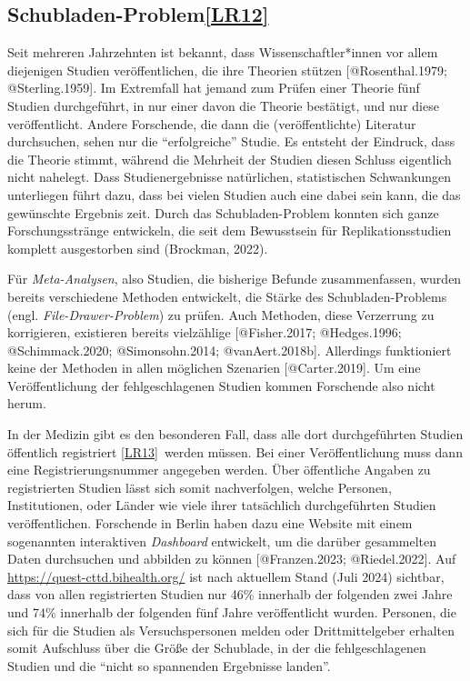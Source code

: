 \documentclass[
  letterpaper,
  DIV=11,
  numbers=noendperiod]{scrreprt}
\begin{document}
\subsection{\texorpdfstring{Schubladen-Problem\hyperref[_msocom_12]{{[}LR12{]}}~}{Schubladen-Problem{[}LR12{]}~}}\label{schubladen-problemlr12}

Seit mehreren Jahrzehnten ist bekannt, dass Wissenschaftler*innen vor
allem diejenigen Studien veröffentlichen, die ihre Theorien stützen
{[}@Rosenthal.1979; @Sterling.1959{]}. Im Extremfall hat jemand zum
Prüfen einer Theorie fünf Studien durchgeführt, in nur einer davon die
Theorie bestätigt, und nur diese veröffentlicht. Andere Forschende, die
dann die (veröffentlichte) Literatur durchsuchen, sehen nur die
``erfolgreiche'' Studie. Es entsteht der Eindruck, dass die Theorie
stimmt, während die Mehrheit der Studien diesen Schluss eigentlich nicht
nahelegt. Dass Studienergebnisse natürlichen, statistischen Schwankungen
unterliegen führt dazu, dass bei vielen Studien auch eine dabei sein
kann, die das gewünschte Ergebnis zeit. Durch das Schubladen-Problem
konnten sich ganze Forschungsstränge entwickeln, die seit dem
Bewusstsein für Replikationsstudien komplett ausgestorben sind
(Brockman, 2022).

Für \emph{Meta-Analysen}, also Studien, die bisherige Befunde
zusammenfassen, wurden bereits verschiedene Methoden entwickelt, die
Stärke des Schubladen-Problems (engl. \emph{File-Drawer-Problem}) zu
prüfen. Auch Methoden, diese Verzerrung zu korrigieren, existieren
bereits vielzählige {[}@Fisher.2017; @Hedges.1996; @Schimmack.2020;
@Simonsohn.2014; @vanAert.2018b{]}. Allerdings funktioniert keine der
Methoden in allen möglichen Szenarien {[}@Carter.2019{]}. Um eine
Veröffentlichung der fehlgeschlagenen Studien kommen Forschende also
nicht herum.

In der Medizin gibt es den besonderen Fall, dass alle dort
durchgeführten Studien öffentlich registriert
\hyperref[_msocom_13]{{[}LR13{]}}~werden müssen. Bei einer
Veröffentlichung muss dann eine Registrierungsnummer angegeben werden.
Über öffentliche Angaben zu registrierten Studien lässt sich somit
nachverfolgen, welche Personen, Institutionen, oder Länder wie viele
ihrer tatsächlich durchgeführten Studien veröffentlichen. Forschende in
Berlin haben dazu eine Website mit einem sogenannten interaktiven
\emph{Dashboard} entwickelt, um die darüber gesammelten Daten
durchsuchen und abbilden zu können {[}@Franzen.2023; @Riedel.2022{]}.
Auf \url{https://quest-cttd.bihealth.org/} ist nach aktuellem Stand
(Juli 2024) sichtbar, dass von allen registrierten Studien nur 46\%
innerhalb der folgenden zwei Jahre und 74\% innerhalb der folgenden fünf
Jahre veröffentlicht wurden. Personen, die sich für die Studien als
Versuchspersonen melden oder Drittmittelgeber erhalten somit Aufschluss
über die Größe der Schublade, in der die fehlgeschlagenen Studien und
die ``nicht so spannenden Ergebnisse landen''.
\end{document}
